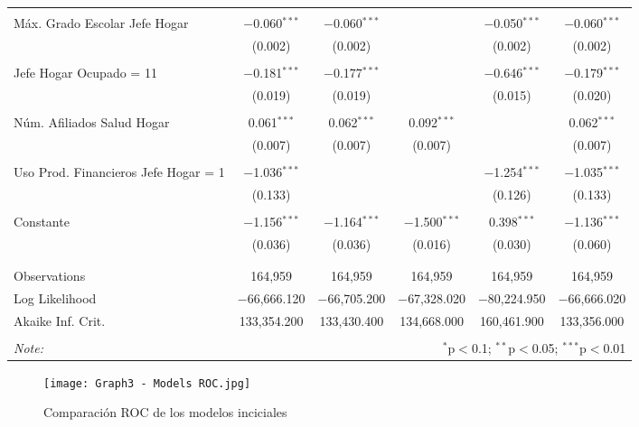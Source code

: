 \documentclass[11pt]{article}
\begin{document}
\begin{table}[!htbp]
{\begin{tabular}{@{\extracolsep{5pt}}lccccc}
  & & & & & \\ 
 Máx. Grado Escolar Jefe Hogar & $-$0.060$^{***}$ & $-$0.060$^{***}$ &  & $-$0.050$^{***}$ & $-$0.060$^{***}$ \\ 
  & (0.002) & (0.002) &  & (0.002) & (0.002) \\ 
  & & & & & \\ 
 Jefe Hogar Ocupado = 11 & $-$0.181$^{***}$ & $-$0.177$^{***}$ &  & $-$0.646$^{***}$ & $-$0.179$^{***}$ \\ 
  & (0.019) & (0.019) &  & (0.015) & (0.020) \\ 
  & & & & & \\ 
 Núm. Afiliados Salud Hogar & 0.061$^{***}$ & 0.062$^{***}$ & 0.092$^{***}$ &  & 0.062$^{***}$ \\ 
  & (0.007) & (0.007) & (0.007) &  & (0.007) \\ 
  & & & & & \\ 
 Uso Prod. Financieros Jefe Hogar = 1& $-$1.036$^{***}$ &  &  & $-$1.254$^{***}$ & $-$1.035$^{***}$ \\ 
  & (0.133) &  &  & (0.126) & (0.133) \\ 
  & & & & & \\ 
 Constante & $-$1.156$^{***}$ & $-$1.164$^{***}$ & $-$1.500$^{***}$ & 0.398$^{***}$ & $-$1.136$^{***}$ \\ 
  & (0.036) & (0.036) & (0.016) & (0.030) & (0.060) \\ 
  & & & & & \\ 
\hline \\[-1.8ex] 
Observations & 164,959 & 164,959 & 164,959 & 164,959 & 164,959 \\ 
Log Likelihood & $-$66,666.120 & $-$66,705.200 & $-$67,328.020 & $-$80,224.950 & $-$66,666.020 \\ 
Akaike Inf. Crit. & 133,354.200 & 133,430.400 & 134,668.000 & 160,461.900 & 133,356.000 \\ 
\hline 
\hline \\[-1.8ex] 
\textit{Note:}  & \multicolumn{5}{r}{$^{*}$p$<$0.1; $^{**}$p$<$0.05; $^{***}$p$<$0.01} \\ 
\end{tabular} }
\end{table}


\begin{figure}[h]
\caption{Comparación ROC de los modelos inciciales }
\centering
\texttt{[image: Graph3 - Models ROC.jpg]}
\end{figure}
\end{document}
